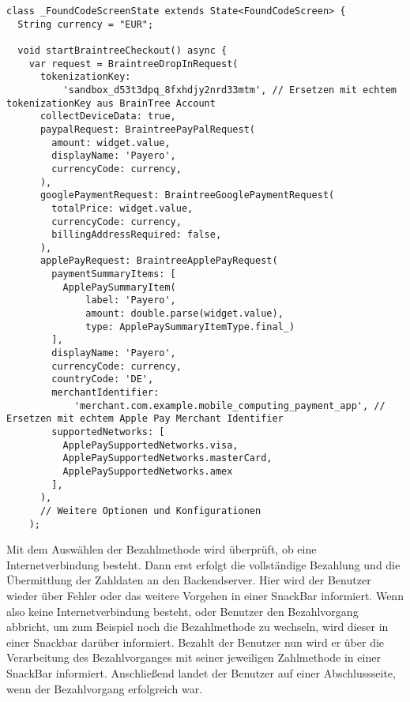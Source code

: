 \begin{lstlisting}[caption={BrainTree Bezahlmethoden}]
  class _FoundCodeScreenState extends State<FoundCodeScreen> {
  String currency = "EUR";

  void startBraintreeCheckout() async {
    var request = BraintreeDropInRequest(
      tokenizationKey:
          'sandbox_d53t3dpq_8fxhdjy2nrd33mtm', // Ersetzen mit echtem tokenizationKey aus BrainTree Account
      collectDeviceData: true,
      paypalRequest: BraintreePayPalRequest(
        amount: widget.value,
        displayName: 'Payero',
        currencyCode: currency,
      ),
      googlePaymentRequest: BraintreeGooglePaymentRequest(
        totalPrice: widget.value,
        currencyCode: currency,
        billingAddressRequired: false,
      ),
      applePayRequest: BraintreeApplePayRequest(
        paymentSummaryItems: [
          ApplePaySummaryItem(
              label: 'Payero',
              amount: double.parse(widget.value),
              type: ApplePaySummaryItemType.final_)
        ],
        displayName: 'Payero',
        currencyCode: currency,
        countryCode: 'DE',
        merchantIdentifier:
            'merchant.com.example.mobile_computing_payment_app', // Ersetzen mit echtem Apple Pay Merchant Identifier
        supportedNetworks: [
          ApplePaySupportedNetworks.visa,
          ApplePaySupportedNetworks.masterCard,
          ApplePaySupportedNetworks.amex
        ],
      ),
      // Weitere Optionen und Konfigurationen
    );  
\end{lstlisting}

Mit dem Auswählen der Bezahlmethode wird überprüft, ob eine Internetverbindung besteht.
Dann erst erfolgt die vollständige Bezahlung und die Übermittlung der Zahldaten an den Backendserver.
Hier wird der Benutzer wieder über Fehler oder das weitere Vorgehen in einer SnackBar informiert.
Wenn also keine Internetverbindung besteht, oder Benutzer den Bezahlvorgang abbricht, um zum Beispiel noch die Bezahlmethode zu wechseln, wird dieser in einer Snackbar darüber informiert.
Bezahlt der Benutzer nun wird er über die Verarbeitung des Bezahlvorganges mit seiner jeweiligen Zahlmethode in einer SnackBar informiert.
Anschließend landet der Benutzer auf einer Abschlussseite, wenn der Bezahlvorgang erfolgreich war.

